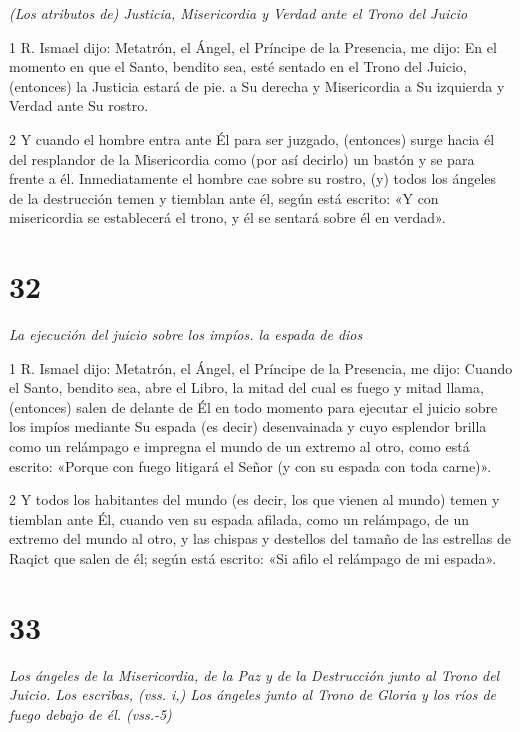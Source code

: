 \par \textit{(Los atributos de) Justicia, Misericordia y Verdad ante el Trono del Juicio}

\par 1 R. Ismael dijo: Metatrón, el Ángel, el Príncipe de la Presencia, me dijo: En el momento en que el Santo, bendito sea, esté sentado en el Trono del Juicio, (entonces) la Justicia estará de pie. a Su derecha y Misericordia a Su izquierda y Verdad ante Su rostro.

\par 2 Y cuando el hombre entra ante Él para ser juzgado, (entonces) surge hacia él del resplandor de la Misericordia como (por así decirlo) un bastón y se para frente a él. Inmediatamente el hombre cae sobre su rostro, (y) todos los ángeles de la destrucción temen y tiemblan ante él, según está escrito: «Y con misericordia se establecerá el trono, y él se sentará sobre él en verdad».

\chapter{32}

\par \textit{La ejecución del juicio sobre los impíos. la espada de dios}

\par 1 R. Ismael dijo: Metatrón, el Ángel, el Príncipe de la Presencia, me dijo: Cuando el Santo, bendito sea, abre el Libro, la mitad del cual es fuego y mitad llama, (entonces) salen de delante de Él en todo momento para ejecutar el juicio sobre los impíos mediante Su espada (es decir) desenvainada y cuyo esplendor brilla como un relámpago e impregna el mundo de un extremo al otro, como está escrito: «Porque con fuego litigará el Señor (y con su espada con toda carne)».

\par 2 Y todos los habitantes del mundo (es decir, los que vienen al mundo) temen y tiemblan ante Él, cuando ven su espada afilada, como un relámpago, de un extremo del mundo al otro, y las chispas y destellos del tamaño de las estrellas de Raqict que salen de él; según está escrito: «Si afilo el relámpago de mi espada».


\chapter{33}

\par \textit{Los ángeles de la Misericordia, de la Paz y de la Destrucción junto al Trono del Juicio. Los escribas, (vss. i,) Los ángeles junto al Trono de Gloria y los ríos de fuego debajo de él. (vss.-5)}

